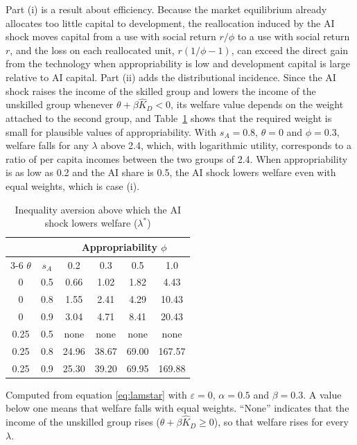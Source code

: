 \documentclass[AER]{AEA}
\newcommand{\sA}{s_A}
\begin{document}
Part (i) is a result about efficiency. Because the market equilibrium already allocates too little capital to development, the reallocation induced by the AI shock moves capital from a use with social return $r/\phi$ to a use with social return $r$, and the loss on each reallocated unit, $r(1/\phi-1)$, can exceed the direct gain from the technology when appropriability is low and development capital is large relative to AI capital. Part (ii) adds the distributional incidence. Since the AI shock raises the income of the skilled group and lowers the income of the unskilled group whenever $\theta+\beta\hat{K}_D<0$, its welfare value depends on the weight attached to the second group, and Table~\ref{tab:lam} shows that the required weight is small for plausible values of appropriability. With $\sA=0.8$, $\theta=0$ and $\phi=0.3$, welfare falls for any $\lambda$ above 2.4, which, with logarithmic utility, corresponds to a ratio of per capita incomes between the two groups of 2.4. When appropriability is as low as 0.2 and the AI share is 0.5, the AI shock lowers welfare even with equal weights, which is case (i).

\begin{table}
\caption{Inequality aversion above which the AI shock lowers welfare ($\lambda^{*}$)}\label{tab:lam}
\begin{tabular}{cccccc}
\toprule
 & & \multicolumn{4}{c}{Appropriability $\phi$} \\
\cmidrule(lr){3-6}
$\theta$ & $\sA$ & 0.2 & 0.3 & 0.5 & 1.0 \\
\midrule
0 & 0.5 & 0.66 & 1.02 & 1.82 & 4.43 \\
0 & 0.8 & 1.55 & 2.41 & 4.29 & 10.43 \\
0 & 0.9 & 3.04 & 4.71 & 8.41 & 20.43 \\
0.25 & 0.5 & none & none & none & none \\
0.25 & 0.8 & 24.96 & 38.67 & 69.00 & 167.57 \\
0.25 & 0.9 & 25.30 & 39.20 & 69.95 & 169.88 \\
\bottomrule
\end{tabular}
\begin{tablenotes}
Computed from equation \eqref{eq:lamstar} with $\varepsilon=0$, $\alpha=0.5$ and $\beta=0.3$. A value below one means that welfare falls with equal weights. ``None'' indicates that the income of the unskilled group rises ($\theta+\beta\hat{K}_D\ge0$), so that welfare rises for every $\lambda$.
\end{tablenotes}
\end{table}
\end{document}
